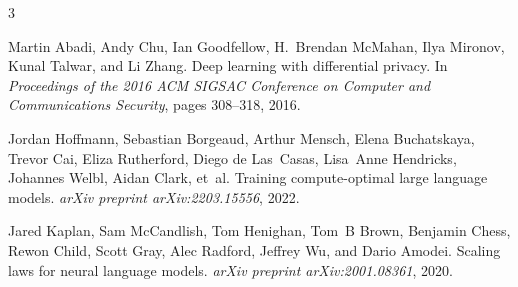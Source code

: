 \documentclass[11pt,a4paper]{article}
\begin{document}

\begin{thebibliography}{3}

Martin Abadi, Andy Chu, Ian Goodfellow, H.~Brendan McMahan, Ilya Mironov, Kunal Talwar, and Li Zhang.
\newblock Deep learning with differential privacy.
\newblock In \emph{Proceedings of the 2016 ACM SIGSAC Conference on Computer and Communications Security}, pages 308--318, 2016.

Jordan Hoffmann, Sebastian Borgeaud, Arthur Mensch, Elena Buchatskaya, Trevor Cai, Eliza Rutherford, Diego de Las~Casas, Lisa~Anne Hendricks, Johannes Welbl, Aidan Clark, et~al.
\newblock Training compute-optimal large language models.
\newblock \emph{arXiv preprint arXiv:2203.15556}, 2022.

Jared Kaplan, Sam McCandlish, Tom Henighan, Tom~B Brown, Benjamin Chess, Rewon Child, Scott Gray, Alec Radford, Jeffrey Wu, and Dario Amodei.
\newblock Scaling laws for neural language models.
\newblock \emph{arXiv preprint arXiv:2001.08361}, 2020.

\end{thebibliography}
\end{document}
